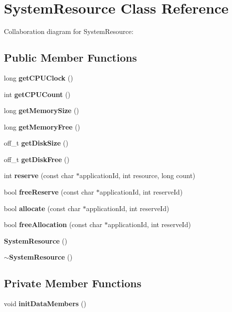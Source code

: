 \section{SystemResource Class Reference}
\label{classbr_1_1ufscar_1_1lince_1_1ginga_1_1recommender_1_1SystemResource}
Collaboration diagram for SystemResource:\subsection*{Public Member Functions}
\begin{CompactItemize}
\item 
long {\bf getCPUClock} ()
\item 
int {\bf getCPUCount} ()
\item 
long {\bf getMemorySize} ()
\item 
long {\bf getMemoryFree} ()
\item 
off\_\-t {\bf getDiskSize} ()
\item 
off\_\-t {\bf getDiskFree} ()
\item 
int {\bf reserve} (const char $\ast$applicationId, int resource, long count)
\item 
bool {\bf freeReserve} (const char $\ast$applicationId, int reserveId)
\item 
bool {\bf allocate} (const char $\ast$applicationId, int reserveId)
\item 
bool {\bf freeAllocation} (const char $\ast$applicationId, int reserveId)
\item 
{\bf SystemResource} ()
\item 
{\bf $\sim$SystemResource} ()
\end{CompactItemize}
\subsection*{Private Member Functions}
\begin{CompactItemize}
\item 
void {\bf initDataMembers} ()
\end{CompactItemize}

